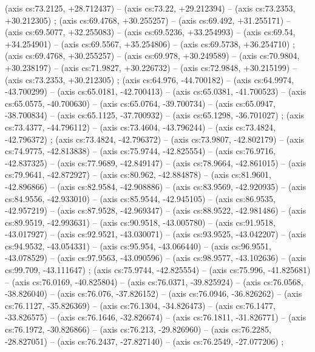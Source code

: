     (axis cs:73.2125,    +28.712437) --  (axis cs:73.22,    +29.212394) --  (axis cs:73.2353,    +30.212305) ;
    (axis cs:69.4768,    +30.255257) --  (axis cs:69.492,    +31.255171) --  (axis cs:69.5077,    +32.255083) --  (axis cs:69.5236,    +33.254993) --  (axis cs:69.54,    +34.254901) --  (axis cs:69.5567,    +35.254806) --  (axis cs:69.5738,    +36.254710) ;
    (axis cs:69.4768,    +30.255257) --  (axis cs:69.978,    +30.249589) --  (axis cs:70.9804,    +30.238197) --  (axis cs:71.9827,    +30.226732) --  (axis cs:72.9848,    +30.215199) --  (axis cs:73.2353,    +30.212305) ;
    (axis cs:64.976,    -44.700182) --  (axis cs:64.9974,    -43.700299) --  (axis cs:65.0181,    -42.700413) --  (axis cs:65.0381,    -41.700523) --  (axis cs:65.0575,    -40.700630) --  (axis cs:65.0764,    -39.700734) --  (axis cs:65.0947,    -38.700834) --  (axis cs:65.1125,    -37.700932) --  (axis cs:65.1298,    -36.701027) ;
    (axis cs:73.4377,    -44.796112) --  (axis cs:73.4604,    -43.796244) --  (axis cs:73.4824,    -42.796372) ;
    (axis cs:73.4824,    -42.796372) --  (axis cs:73.9807,    -42.802179) --  (axis cs:74.9775,    -42.813838) --  (axis cs:75.9744,    -42.825554) --  (axis cs:76.9716,    -42.837325) --  (axis cs:77.9689,    -42.849147) --  (axis cs:78.9664,    -42.861015) --  (axis cs:79.9641,    -42.872927) --  (axis cs:80.962,    -42.884878) --  (axis cs:81.9601,    -42.896866) --  (axis cs:82.9584,    -42.908886) --  (axis cs:83.9569,    -42.920935) --  (axis cs:84.9556,    -42.933010) --  (axis cs:85.9544,    -42.945105) --  (axis cs:86.9535,    -42.957219) --  (axis cs:87.9528,    -42.969347) --  (axis cs:88.9522,    -42.981486) --  (axis cs:89.9519,    -42.993631) --  (axis cs:90.9518,    -43.005780) --  (axis cs:91.9518,    -43.017927) --  (axis cs:92.9521,    -43.030071) --  (axis cs:93.9525,    -43.042207) --  (axis cs:94.9532,    -43.054331) --  (axis cs:95.954,    -43.066440) --  (axis cs:96.9551,    -43.078529) --  (axis cs:97.9563,    -43.090596) --  (axis cs:98.9577,    -43.102636) --  (axis cs:99.709,    -43.111647) ;
    (axis cs:75.9744,    -42.825554) --  (axis cs:75.996,    -41.825681) --  (axis cs:76.0169,    -40.825804) --  (axis cs:76.0371,    -39.825924) --  (axis cs:76.0568,    -38.826040) --  (axis cs:76.076,    -37.826152) --  (axis cs:76.0946,    -36.826262) --  (axis cs:76.1127,    -35.826369) --  (axis cs:76.1304,    -34.826473) --  (axis cs:76.1477,    -33.826575) --  (axis cs:76.1646,    -32.826674) --  (axis cs:76.1811,    -31.826771) --  (axis cs:76.1972,    -30.826866) --  (axis cs:76.213,    -29.826960) --  (axis cs:76.2285,    -28.827051) --  (axis cs:76.2437,    -27.827140) --  (axis cs:76.2549,    -27.077206) ;
